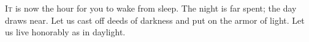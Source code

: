 
\lettrine{I}{t} is now the hour for you to wake from sleep. The night is far spent; the day draws near. Let us cast off deeds of darkness and put on the armor of light. Let us live honorably as in daylight.